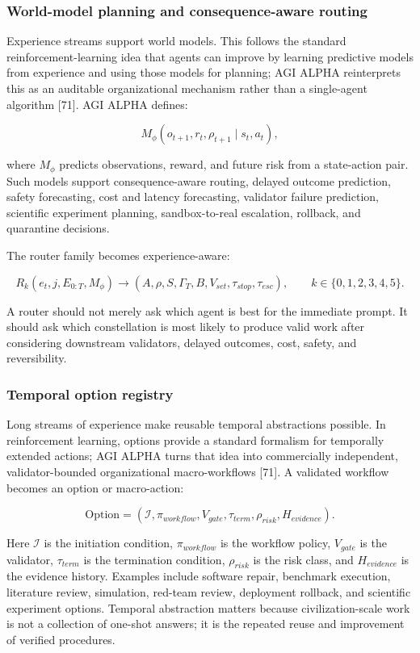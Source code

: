 \subsubsection{World-model planning and consequence-aware
routing}\label{world-model-planning-and-consequence-aware-routing}

Experience streams support world models. This follows the standard
reinforcement-learning idea that agents can improve by learning
predictive models from experience and using those models for planning;
AGI ALPHA reinterprets this as an auditable organizational mechanism
rather than a single-agent algorithm {[}71{]}. AGI ALPHA defines:

\[
M_\phi(o_{t+1},r_t,\rho_{t+1}\mid s_t,a_t),
\]

where \(M_\phi\) predicts observations, reward, and future risk from a
state-action pair. Such models support consequence-aware routing,
delayed outcome prediction, safety forecasting, cost and latency
forecasting, validator failure prediction, scientific experiment
planning, sandbox-to-real escalation, rollback, and quarantine
decisions.

The router family becomes experience-aware:

\[
R_k(e_t,j,E_{0:T},M_\phi)\rightarrow(A,\rho,S,\Gamma_T,B,V_{set},\tau_{stop},\tau_{esc}),\qquad k\in\{0,1,2,3,4,5\}.
\]

A router should not merely ask which agent is best for the immediate
prompt. It should ask which constellation is most likely to produce
valid work after considering downstream validators, delayed outcomes,
cost, safety, and reversibility.

\subsubsection{Temporal option registry}\label{temporal-option-registry}

Long streams of experience make reusable temporal abstractions possible.
In reinforcement learning, options provide a standard formalism for
temporally extended actions; AGI ALPHA turns that idea into commercially
independent, validator-bounded organizational macro-workflows {[}71{]}.
A validated workflow becomes an option or macro-action:

\[
\mathrm{Option}=(\mathcal{I},\pi_{workflow},V_{gate},\tau_{term},\rho_{risk},H_{evidence}).
\]

Here \(\mathcal{I}\) is the initiation condition, \(\pi_{workflow}\) is
the workflow policy, \(V_{gate}\) is the validator, \(\tau_{term}\) is
the termination condition, \(\rho_{risk}\) is the risk class, and
\(H_{evidence}\) is the evidence history. Examples include software
repair, benchmark execution, literature review, simulation, red-team
review, deployment rollback, and scientific experiment options. Temporal
abstraction matters because civilization-scale work is not a collection
of one-shot answers; it is the repeated reuse and improvement of
verified procedures.

